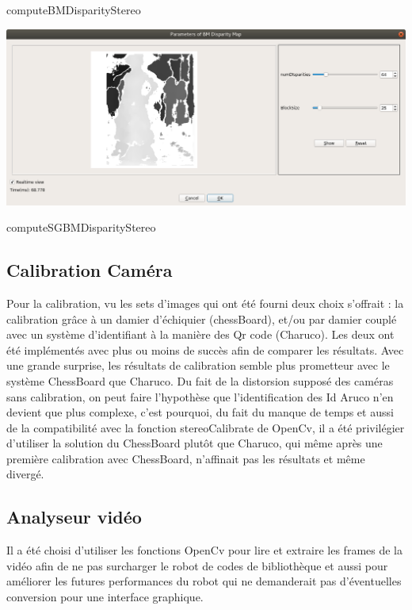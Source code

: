 \documentclass{article}
\begin{document}
computeBMDisparityStereo
    
\includegraphics[width=\linewidth]{img/sgbm.png}
    
computeSGBMDisparityStereo

\par\leavevmode\par
\subsection{Calibration Caméra}


Pour la calibration, vu les sets d'images qui ont été fourni deux choix s'offrait : la calibration grâce à un damier d'échiquier (chessBoard), et/ou par damier couplé avec un système d'identifiant à la manière des Qr code (Charuco). 
Les deux ont été implémentés avec plus ou moins de succès afin de comparer les résultats.
Avec une grande surprise, les résultats de calibration semble plus prometteur avec le système ChessBoard que Charuco.
Du fait de la distorsion supposé des caméras sans calibration, on peut faire l’hypothèse que l'identification des Id Aruco n'en devient que plus complexe, c'est pourquoi, du fait du manque de temps et aussi de la compatibilité avec la fonction stereoCalibrate de OpenCv, il a été privilégier d'utiliser la solution du ChessBoard plutôt que Charuco, qui même après une première calibration avec ChessBoard, n'affinait pas les résultats et même divergé.

\par\leavevmode\par
\subsection{Analyseur vidéo}

Il a été choisi d'utiliser les fonctions OpenCv pour lire et extraire les frames de la vidéo afin de ne pas surcharger le robot de codes de bibliothèque et aussi pour améliorer les futures performances du robot qui ne demanderait pas d'éventuelles conversion pour une interface graphique.\\
\end{document}

